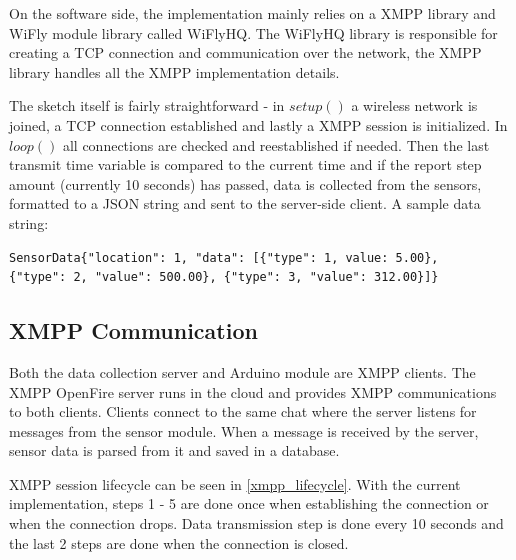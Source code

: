 On the software side, the implementation mainly relies on a XMPP library and WiFly module library called WiFlyHQ. The WiFlyHQ library is responsible for creating a TCP connection and communication over the network, the XMPP library handles all the XMPP implementation details. 

The sketch itself is fairly straightforward - in $setup()$ a wireless network is joined, a TCP connection established and lastly a XMPP session is initialized. In $loop()$ all connections are checked and reestablished if needed. Then the last transmit time variable is compared to the current time and if the report step amount (currently 10 seconds) has passed, data is collected from the sensors, formatted to a JSON string and sent to the server-side client. A sample data string:

\begin{center}
\begin{lstlisting}
SensorData{"location": 1, "data": [{"type": 1, value: 5.00}, 
{"type": 2, "value": 500.00}, {"type": 3, "value": 312.00}]}
\end{lstlisting}
\end{center}

\subsection{XMPP Communication}

Both the data collection server and Arduino module are XMPP clients. The XMPP OpenFire server runs in the cloud and provides XMPP communications to both clients. Clients connect to the same chat where the server listens for messages from the sensor module. When a message is received by the server, sensor data is parsed from it and saved in a database.

XMPP session lifecycle can be seen in \autoref{xmpp_lifecycle}. With the current implementation, steps 1 - 5 are done once when establishing the connection or when the connection drops. Data transmission step is done every 10 seconds and the last 2 steps are done when the connection is closed.

